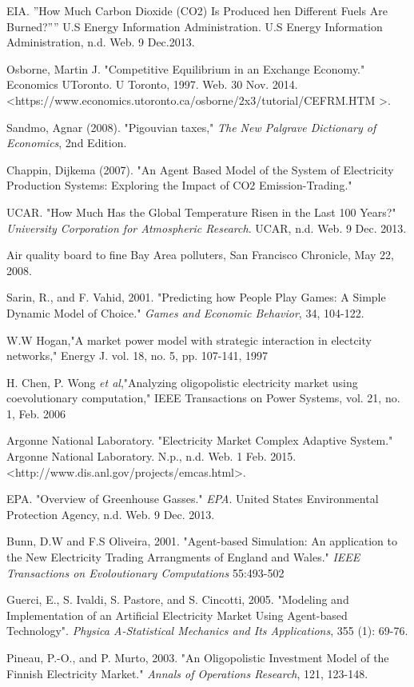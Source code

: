 \documentclass[12pt]{article}
\begin{document}
\begin{thebibliography}{1}

	 EIA. ”How Much Carbon Dioxide (CO2) Is Produced hen Different Fuels Are Burned?”” U.S Energy Information Administration. U.S Energy Information Administration, n.d. Web. 9 Dec.2013.

	 Osborne, Martin J. "Competitive Equilibrium in an Exchange Economy." Economics UToronto. U Toronto, 1997. Web. 30 Nov. 2014. \*
	\textless https://www.economics.utoronto.ca/osborne/2x3/tutorial/CEFRM.HTM \textgreater.

	 Sandmo, Agnar (2008). "Pigouvian taxes," \emph{The New Palgrave Dictionary of Economics}, 2nd Edition.

	 Chappin, Dijkema (2007). "An Agent Based Model of the System of Electricity Production Systems: Exploring the Impact of CO2 Emission-Trading."

	 UCAR. "How Much Has the Global Temperature Risen in the Last 100 Years?" \emph{University Corporation for Atmospheric Research}. UCAR, n.d. Web. 9 Dec. 2013. 


	 Air quality board to fine Bay Area polluters, San Francisco Chronicle, May 22, 2008.

	 Sarin, R., and F. Vahid, 2001. "Predicting how People Play Games: A Simple Dynamic Model of Choice." \emph{Games and Economic Behavior}, 34, 104-122.


	 W.W Hogan,"A market power model with strategic interaction in electcity networks," Energy J. vol. 18, no. 5, pp. 107-141, 1997

	 H. Chen, P. Wong \emph{et al},"Analyzing oligopolistic electricity market using coevolutionary computation," IEEE Transactions on Power Systems, vol. 21, no. 1, Feb. 2006

	 Argonne National Laboratory. "Electricity Market Complex Adaptive System." 
     Argonne National Laboratory. N.p., n.d. Web. 1 Feb. 2015. 
     \textless http://www.dis.anl.gov/projects/emcas.html\textgreater. 

      EPA. "Overview of Greenhouse Gasses." \emph{EPA}. United States Environmental Protection Agency, n.d. Web. 9 Dec. 2013.


      Bunn, D.W and F.S Oliveira, 2001. "Agent-based Simulation: An application to the New Electricity Trading Arrangments of England and Wales." \emph{IEEE Transactions on Evoloutionary Computations} 5{5}:493-502

      Guerci, E., S. Ivaldi, S. Pastore, and S. Cincotti, 2005. "Modeling and Implementation of an Artificial Electricity Market Using Agent-based Technology". \emph{Physica A-Statistical Mechanics and Its Applications}, 355 (1): 69-76.

     Pineau, P.-O., and P. Murto, 2003. "An Oligopolistic Investment Model of the Finnish Electricity Market." \emph{Annals of Operations Research}, 121, 123-148.
\end{thebibliography}
\end{document}

